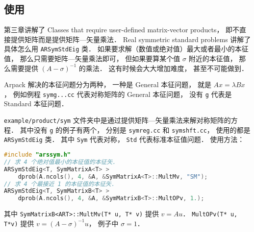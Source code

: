 \subsection{使用}
第三章讲解了 Classes that require user-defined matrix-vector products， 即不直接提供矩阵而是提供矩阵—矢量乘法． Real symmetric standard problems 讲解了具体怎么用 \verb|ARSymStdEig| 类． 如果要求解（数值或绝对值）最大或者最小的本征值， 那么只需要矩阵—矢量乘法即可， 但如果要算某个值 $\sigma$ 附近的本征值， 那么需要提供 $(A - \sigma)^{-1}$ 的乘法． 这有时候会大大增加难度， 甚至不可能做到．

Arpack 解决的本征问题分为两种， 一种是 General 本征问题， 就是 $Ax = \lambda Bx$， 例如例程 \verb|symg...cc| 代表对称矩阵的 General 本征问题， 没有 \verb|g| 代表是 Standard 本征问题．

\verb|example/product/sym| 文件夹中是通过提供矩阵—矢量乘法来解对称矩阵的方程． 其中没有 \verb|g| 的例子有两个， 分别是 \verb|symreg.cc| 和 \verb|symshft.cc|， 使用的都是 \verb|ARSymStdEig| 类． 其中 \verb|Sym| 代表对称， \verb|Std| 代表标准本征值问题． 使用方法：
\begin{lstlisting}[language=cpp]
#include "arssym.h"
// 求 4 个绝对值最小的本征值的本征矢．
ARSymStdEig<T, SymMatrixA<T> >
    dprob(A.ncols(), 4, &A, &SymMatrixA<T>::MultMv, "SM");
// 求 4 个最接近 1 的本征值的本征矢．
ARSymStdEig<T, SymMatrixB<T> >
    dprob(A.ncols(), 4, &A, &SymMatrixB<T>::MultOPv, 1.);
\end{lstlisting}
其中 \verb|SymMatrixB<ART>::MultMv(T* u, T* v)| 提供 $v = Au$． \verb|MultOPv(T* u, T*v)| 提供 $v = (A - \sigma)^{-1}u$， 例子中 $\sigma = 1$．
